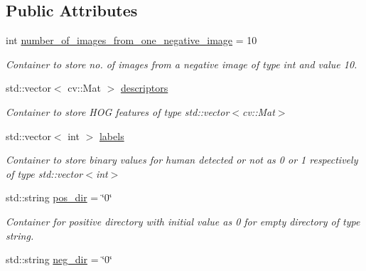 \subsection*{Public Attributes}
\begin{DoxyCompactItemize}
\item 
int \hyperlink{classDataLoader_ae66f042476b4bb478937bb273716685b}{number\+\_\+of\+\_\+images\+\_\+from\+\_\+one\+\_\+negative\+\_\+image} = 10\hypertarget{classDataLoader_ae66f042476b4bb478937bb273716685b}{}\label{classDataLoader_ae66f042476b4bb478937bb273716685b}

\begin{DoxyCompactList}\small\item\em Container to store no. of images from a negative image of type int and value 10. \end{DoxyCompactList}\item 
std\+::vector$<$ cv\+::\+Mat $>$ \hyperlink{classDataLoader_abbf7358e729896c157169ba82aeb3d76}{descriptors}\hypertarget{classDataLoader_abbf7358e729896c157169ba82aeb3d76}{}\label{classDataLoader_abbf7358e729896c157169ba82aeb3d76}

\begin{DoxyCompactList}\small\item\em Container to store H\+OG features of type std\+::vector$<$cv\+::\+Mat$>$ \end{DoxyCompactList}\item 
std\+::vector$<$ int $>$ \hyperlink{classDataLoader_ae6c7b365e2318594bbe07be03e38f1d6}{labels}\hypertarget{classDataLoader_ae6c7b365e2318594bbe07be03e38f1d6}{}\label{classDataLoader_ae6c7b365e2318594bbe07be03e38f1d6}

\begin{DoxyCompactList}\small\item\em Container to store binary values for human detected or not as \textquotesingle{}0\textquotesingle{} or \textquotesingle{}1\textquotesingle{} respectively of type std\+::vector$<$int$>$ \end{DoxyCompactList}\item 
std\+::string \hyperlink{classDataLoader_ad431b1dfd8eb640e3f6922a77960c892}{pos\+\_\+dir} = \char`\"{}0\char`\"{}\hypertarget{classDataLoader_ad431b1dfd8eb640e3f6922a77960c892}{}\label{classDataLoader_ad431b1dfd8eb640e3f6922a77960c892}

\begin{DoxyCompactList}\small\item\em Container for positive directory with initial value as 0 for empty directory of type string. \end{DoxyCompactList}\item 
std\+::string \hyperlink{classDataLoader_adf2a0a3e76c068324801194fb1411477}{neg\+\_\+dir} = \char`\"{}0\char`\"{}\hypertarget{classDataLoader_adf2a0a3e76c068324801194fb1411477}{}\label{classDataLoader_adf2a0a3e76c068324801194fb1411477}


\end{DoxyCompactItemize}
